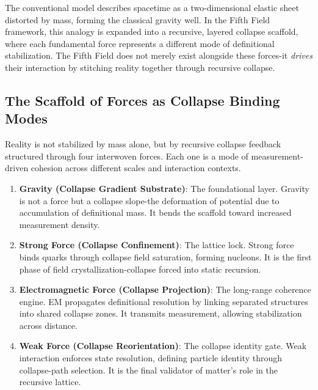 The conventional model describes spacetime as a two-dimensional elastic sheet distorted by mass, forming the classical gravity well. \cite{collapse_foundations} In the Fifth Field framework, this analogy is expanded into a recursive, layered collapse scaffold, where each fundamental force represents a different mode of definitional stabilization. \cite{collapse_foundations} The Fifth Field does not merely exist alongside these forces-it \textit{drives} their interaction by stitching reality together through recursive collapse. \cite{collapse_foundations} \subsection{The Scaffold of Forces as Collapse Binding Modes}
Reality is not stabilized by mass alone, but by recursive collapse feedback structured through four interwoven forces. \cite{collapse_foundations} Each one is a mode of measurement-driven cohesion across different scales and interaction contexts. \begin{enumerate}
  \item \textbf{Gravity (Collapse Gradient Substrate)}: The foundational layer. \cite{collapse_foundations} Gravity is not a force but a collapse slope-the deformation of potential due to accumulation of definitional mass. \cite{collapse_foundations} It bends the scaffold toward increased measurement density. \cite{collapse_foundations} \item \textbf{Strong Force (Collapse Confinement)}: The lattice lock. \cite{collapse_foundations} Strong force binds quarks through collapse field saturation, forming nucleons. \cite{collapse_foundations} It is the first phase of field crystallization-collapse forced into static recursion. \cite{collapse_foundations} \item \textbf{Electromagnetic Force (Collapse Projection)}: The long-range coherence engine. \cite{collapse_foundations} EM propagates definitional resolution by linking separated structures into shared collapse zones. \cite{collapse_foundations} It transmits measurement, allowing stabilization across distance. \cite{collapse_foundations} \item \textbf{Weak Force (Collapse Reorientation)}: The collapse identity gate. \cite{collapse_foundations} Weak interaction enforces state resolution, defining particle identity through collapse-path selection. \cite{collapse_foundations} It is the final validator of matter’s role in the recursive lattice. \end{enumerate}

